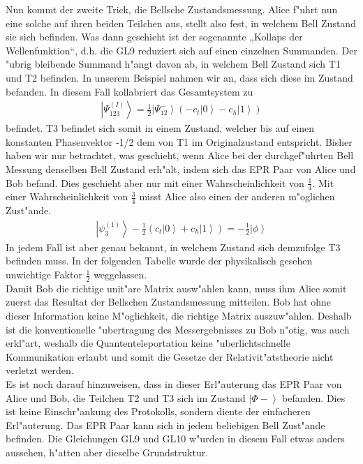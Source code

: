 \begin{refsection}
Nun kommt der zweite Trick, die Bellsche Zustandsmessung. Alice f"uhrt nun eine solche auf ihren beiden Teilchen aus, stellt also fest, in welchem Bell Zustand sie sich befinden. Was dann geschieht ist der sogenannte „Kollaps der Wellenfunktion“, d.h. die GL9 reduziert sich auf einen einzelnen Summanden. Der "ubrig bleibende Summand h"angt davon ab, in welchem Bell Zustand sich T1 und T2 befinden. In unserem Beispiel nahmen wir an, dass sich diese im Zustand befanden. In diesem Fall kollabriert das Gesamtsystem zu
\begin{align}
\left| \Psi_{123}^{(I)} \right\rangle = \frac{1}{2} \left| \Psi_{12}^{-} \right \rangle (-c_{t} \left| 0 \right \rangle - c_{h} \left| 1 \right\rangle)
\end{align}
befindet. T3 befindet sich somit in einem Zustand, welcher bis auf einen konstanten Phasenvektor -1/2 dem von T1 im Originalzustand entspricht. Bisher haben wir nur betrachtet, was geschieht, wenn Alice bei der durchgef"uhrten Bell Messung denselben Bell Zustand erh"alt, indem sich das EPR Paar von Alice und Bob befand. Dies geschieht aber nur mit einer Wahrscheinlichkeit von $\frac{1}{4}$. Mit einer Wahrscheinlichkeit von $\frac{3}{4}$ misst Alice also einen der anderen m"oglichen Zust"ande.
\begin{align}
\left| \psi_{3}^{(1)} \right\rangle - \frac{1}{2} \left( c_{t} \left| 0 \right \rangle + c_{h} \left| 1 \right \rangle \right ) = - \frac{1}{2} \left| \phi \right \rangle
\end{align}
In jedem Fall ist aber genau bekannt, in welchem Zustand sich demzufolge T3 befinden muss. In der folgenden Tabelle wurde der physikalisch gesehen unwichtige Faktor $\frac{1}{2}$ weggelassen.
\\
Damit Bob die richtige unit"are Matrix ausw"ahlen kann, muss ihm Alice somit zuerst das Resultat der Bellschen Zustandsmessung mitteilen. Bob hat ohne dieser Information keine M"oglichkeit, die richtige Matrix auszuw"ahlen. Deshalb ist die konventionelle "ubertragung des Messergebnisses zu Bob n"otig, was auch erkl"art, weshalb die  Quantenteleportation keine "uberlichtschnelle Kommunikation erlaubt und somit die Gesetze der Relativit"atstheorie nicht verletzt werden.
\\
Es ist noch darauf hinzuweisen, dass in dieser Erl"auterung das EPR Paar von Alice und Bob, die Teilchen T2 und T3 sich im Zustand $\left| \Phi{-} \right\rangle$ befanden. Dies ist keine Einschr"ankung des Protokolls, sondern diente der einfacheren Erl"auterung. Das EPR Paar kann sich in jedem beliebigen Bell Zust"ande befinden. Die Gleichungen GL9 und GL10 w"urden in diesem Fall etwas anders aussehen, h"atten aber dieselbe Grundstruktur.


\end{refsection}
